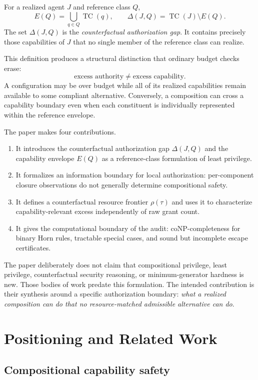 \documentclass[11pt]{article}
\newcommand{\TC}{\operatorname{TC}}
\newcommand{\rhoCF}{\rho}
\begin{document}
For a realized agent $J$ and reference class $Q$,
\[
E(Q)=\bigcup_{q\in Q}\TC(q),
\qquad
\Delta(J,Q)=\TC(J)\setminus E(Q).
\]
The set $\Delta(J,Q)$ is the \emph{counterfactual authorization gap}. It contains precisely those capabilities of $J$ that no single member of the reference class can realize.

This definition produces a structural distinction that ordinary budget checks erase:
\[
\text{excess authority}\neq\text{excess capability}.
\]
A configuration may be over budget while all of its realized capabilities remain available to some compliant alternative. Conversely, a composition can cross a capability boundary even when each constituent is individually represented within the reference envelope.

The paper makes four contributions.

\begin{enumerate}[leftmargin=*]
\item It introduces the counterfactual authorization gap $\Delta(J,Q)$ and the capability envelope $E(Q)$ as a reference-class formulation of least privilege.
\item It formalizes an information boundary for local authorization: per-component closure observations do not generally determine compositional safety.
\item It defines a counterfactual resource frontier $\rhoCF(\tau)$ and uses it to characterize capability-relevant excess independently of raw grant count.
\item It gives the computational boundary of the audit: coNP-completeness for binary Horn rules, tractable special cases, and sound but incomplete escape certificates.
\end{enumerate}

The paper deliberately does not claim that compositional privilege, least privilege, counterfactual security reasoning, or minimum-generator hardness is new. Those bodies of work predate this formulation. The intended contribution is their synthesis around a specific authorization boundary: \emph{what a realized composition can do that no resource-matched admissible alternative can do}.

\section{Positioning and Related Work}

\subsection{Compositional capability safety}
\end{document}
